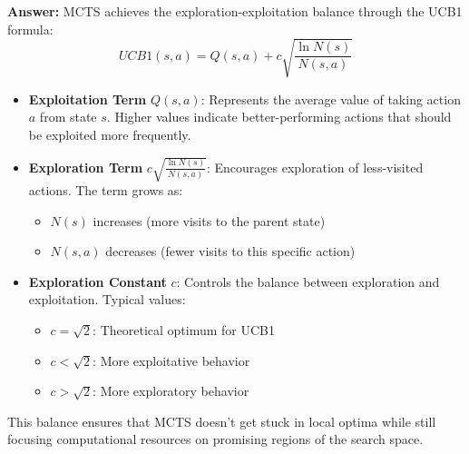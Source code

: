 \begin{itemize}
    \textbf{Answer:} MCTS achieves the exploration-exploitation balance through the UCB1 formula:
    \[UCB1(s,a) = Q(s,a) + c\sqrt{\frac{\ln N(s)}{N(s,a)}}\]
    
    \begin{itemize}
        \item \textbf{Exploitation Term} $Q(s,a)$: Represents the average value of taking action $a$ from state $s$. Higher values indicate better-performing actions that should be exploited more frequently.
        
        \item \textbf{Exploration Term} $c\sqrt{\frac{\ln N(s)}{N(s,a)}}$: Encourages exploration of less-visited actions. The term grows as:
        \begin{itemize}
            \item $N(s)$ increases (more visits to the parent state)
            \item $N(s,a)$ decreases (fewer visits to this specific action)
        \end{itemize}
        
        \item \textbf{Exploration Constant} $c$: Controls the balance between exploration and exploitation. Typical values:
        \begin{itemize}
            \item $c = \sqrt{2}$: Theoretical optimum for UCB1
            \item $c < \sqrt{2}$: More exploitative behavior
            \item $c > \sqrt{2}$: More exploratory behavior
        \end{itemize}
    \end{itemize}
    
    This balance ensures that MCTS doesn't get stuck in local optima while still focusing computational resources on promising regions of the search space.
\end{itemize}

